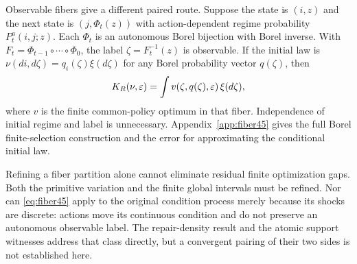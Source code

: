 Observable fibers give a different paired route. Suppose the state is $(i,z)$ and the next state is $(j,\Phi_t(z))$ with action-dependent regime probability $P_t^a(i,j;z)$. Each $\Phi_t$ is an autonomous Borel bijection with Borel inverse. With $F_t=\Phi_{t-1}\circ\cdots\circ\Phi_0$, the label $\zeta=F_t^{-1}(z)$ is observable. If the initial law is $\nu(di,d\zeta)=q_i(\zeta)\xi(d\zeta)$ for any Borel probability vector $q(\zeta)$, then
\begin{equation}\label{eq:fiber45}
 K_R(\nu,\varepsilon)=\int v(\zeta,q(\zeta),\varepsilon)\,\xi(d\zeta),
\end{equation}
where $v$ is the finite common-policy optimum in that fiber. Independence of initial regime and label is unnecessary. Appendix~\ref{app:fiber45} gives the full Borel finite-selection construction and the error for approximating the conditional initial law.

Refining a fiber partition alone cannot eliminate residual finite optimization gaps. Both the primitive variation and the finite global intervals must be refined. Nor can \eqref{eq:fiber45} apply to the original condition process merely because its shocks are discrete: actions move its continuous condition and do not preserve an autonomous observable label. The repair-density result and the atomic support witnesses address that class directly, but a convergent pairing of their two sides is not established here.
